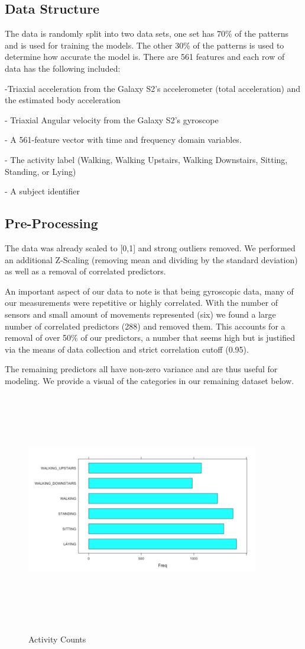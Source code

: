 \documentclass[12pt]{article}
\begin{document}
\subsection{Data Structure}
The data is randomly split into two data sets, one set has 70\% of the patterns and is used for training the models. The other 30\% of the patterns is used to determine how accurate the model is. There are 561 features and each row of data has the following included:

-Triaxial acceleration from the Galaxy S2’s accelerometer (total acceleration) and the estimated body acceleration

- Triaxial Angular velocity from the Galaxy S2’s gyroscope

- A 561-feature vector with time and frequency domain variables. 

- The activity label (Walking, Walking Upstairs, Walking Downstairs, Sitting, Standing, or Lying)

- A subject identifier

\subsection{Pre-Processing}
The data was already scaled to [0,1] and strong outliers removed. We performed an additional Z-Scaling (removing mean and dividing by the standard deviation) as well as a removal of correlated predictors.

An important aspect of our data to note is that being gyroscopic data, many of our measurements were repetitive or highly correlated. With the number of sensors and small amount of movements represented (six) we found a large number of correlated predictors (288) and removed them. This accounts for a removal of over 50\% of our predictors, a number that seems high but is justified via the means of data collection and strict correlation cutoff (0.95). 

The remaining predictors all have non-zero variance and are thus useful for modeling. We provide a visual of the categories in our remaining dataset below.
\begin{figure}[h]
\caption{Activity Counts}
\centering
{\includegraphics[width=4in,height=4in,keepaspectratio]{preproc}}
\end{figure}
\end{document}
